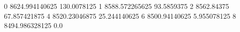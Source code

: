 0 8624.994140625 130.0078125
1 8588.572265625 93.5859375
2 8562.84375 67.857421875
4 8520.23046875 25.244140625
6 8500.94140625 5.955078125
8 8494.986328125 0.0
